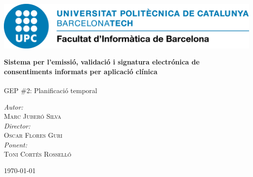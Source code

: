 \begin{titlepage}
\center

\includegraphics[scale=0.4]{img/UPC-FIB.png}
\vspace{2cm}


{\huge \bfseries Sistema per l'emissió, validació i signatura electrónica de consentiments informats per aplicació clínica}\\[0.4cm]
\HRule \\[0.2cm]


\Large GEP \#2: Planificació temporal

\vspace{8cm}

\emph{Autor:}\\ \large
 \textsc{Marc Juberó Silva}\\
\vspace{0.5cm}
\emph{Director:}\\ \large
 \textsc{Oscar Flores Guri}\\
\vspace{0.5cm}
\emph{Ponent:}\\ \large
 \textsc{Toni Cortés Rosselló}\\

\vspace{1cm}


{\large \today}\\[1cm] %

\vfill
\end{titlepage}